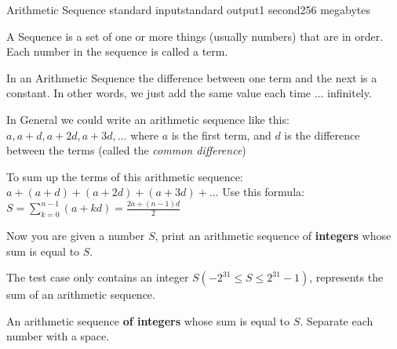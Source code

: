 \begin{problem}{Arithmetic Sequence }{standard input}{standard output}{1 second}{256 megabytes}

    A Sequence is a set of one or more things (usually numbers) that are in order. Each number in the sequence is called a term.

    In an Arithmetic Sequence the difference between one term and the next is a constant. In other words, we just add the same value each time ... infinitely.
    
    In General we could write an arithmetic sequence like this: ${a, a+d, a+2d, a+3d, ... }$ where $a$ is the first term, and $d$ is the difference between the terms (called the \textsl{common difference})
    
    To sum up the terms of this arithmetic sequence: ${a + (a+d) + (a+2d) + (a+3d) + ...}$ Use this formula: $S=\sum_{k=0}^{n-1}(a+kd)=\frac{2a+(n-1)d}{2}$
    
    Now you are given a number $S$, print an arithmetic sequence of \textbf{integers} whose sum is equal to $S$.

\InputFile

The test case only contains an integer $S(-2^{31}\le S \le 2^{31}-1)$, represents the sum of an arithmetic sequence.

\OutputFile

An arithmetic sequence \textbf{of integers} whose sum is equal to $S$. Separate each number with a space.

\Example

\begin{example}
%
%
\end{example}

\end{problem}
